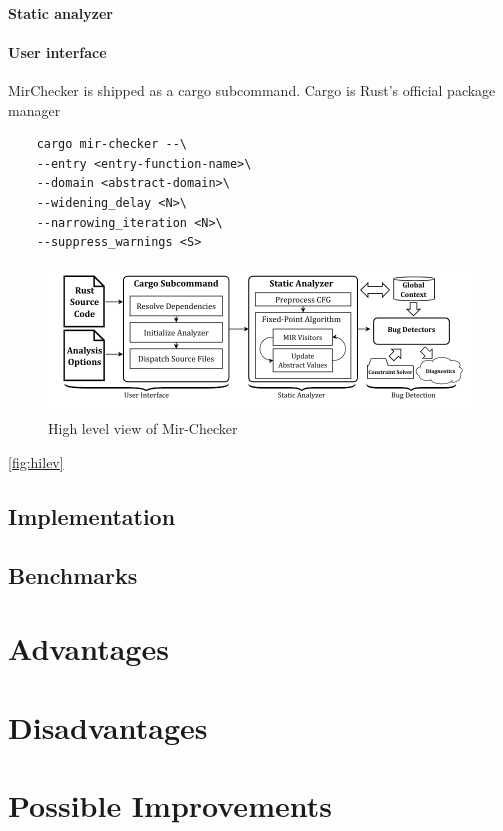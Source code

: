 \documentclass{article}
\begin{document}
\paragraph*{Static analyzer}
\paragraph*{User interface} MirChecker is shipped as a cargo subcommand. 
Cargo is Rust's official package manager

\begin{verbatim}
    cargo mir-checker --\ 
    --entry <entry-function-name>\
    --domain <abstract-domain>\ 
    --widening_delay <N>\
    --narrowing_iteration <N>\ 
    --suppress_warnings <S>
\end{verbatim}
\begin{figure}[H]
    \includegraphics[scale=0.5]{hilev.png}
    \caption{High level view of Mir-Checker}
    \label{fig:hilev}
\end{figure}
\autoref{fig:hilev}
\subsection*{Implementation}
\subsection*{Benchmarks}

\section*{Advantages}

\section*{Disadvantages}

\section*{Possible Improvements}



\end{document}
